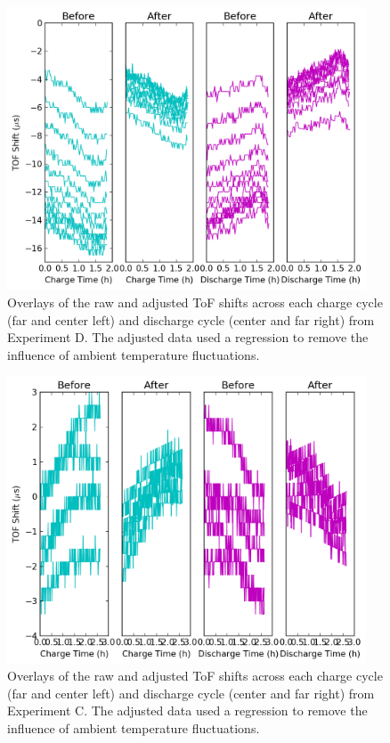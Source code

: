 \begin{figure}[t]\label{fig:0417overlays}
\includegraphics[width=0.95\textwidth]{Thesis/0417overlays.png}
\centering
\caption{Overlays of the raw and adjusted ToF shifts across each charge cycle (far and center left) and discharge cycle (center and far right) from Experiment D. The adjusted data used a regression to remove the influence of ambient temperature fluctuations.}
\end{figure}

\begin{figure}[t]\label{fig:0409overlays}
\includegraphics[width=0.95\textwidth]{Thesis/0409overlays.png}
\centering
\caption{Overlays of the raw and adjusted ToF shifts across each charge cycle (far and center left) and discharge cycle (center and far right) from Experiment C. The adjusted data used a regression to remove the influence of ambient temperature fluctuations.}
\end{figure}
